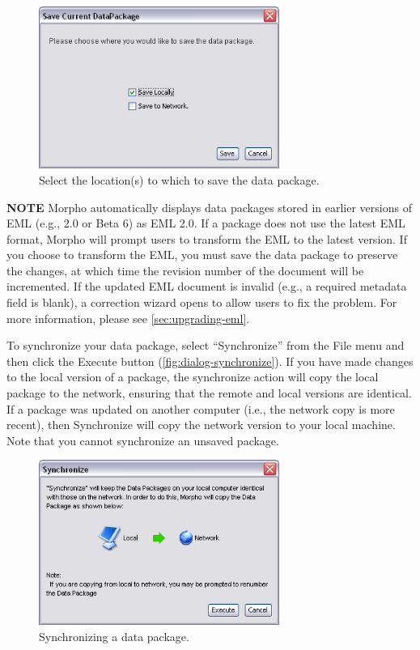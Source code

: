 \begin{figure}
  \centering
    \includegraphics[width=0.7\textwidth]{images/dialog-save-dp.png}
  \caption{Select the location(s) to which to save the data package.}
  \label{fig:dialog-save-dp}
\end{figure}

\begin{shaded}
  \textbf{NOTE} Morpho automatically displays data packages stored in
  earlier versions of EML (e.g., 2.0 or Beta 6) as EML 2.0. If a package
  does not use the latest EML format, Morpho will prompt users to
  transform the EML to the latest version. If you choose to transform
  the EML, you must save the data package to preserve the changes, at
  which time the revision number of the document will be incremented. If
  the updated EML document is invalid (e.g., a required metadata field
  is blank), a correction wizard opens to allow users to fix the
  problem. For more information, please see \autoref{sec:upgrading-eml}.
\end{shaded}

To synchronize your data package, select ``Synchronize'' from the File
menu and then click the Execute button
(\autoref{fig:dialog-synchronize}). If you have made changes to the
local version of a package, the synchronize action will copy the local
package to the network, ensuring that the remote and local versions are
identical. If a package was updated on another computer (i.e., the
network copy is more recent), then Synchronize will copy the network
version to your local machine. Note that you cannot synchronize an
unsaved package.

\begin{figure}
  \centering
    \includegraphics[width=0.7\textwidth]{images/dialog-synchronize.png}
  \caption{Synchronizing a data package.}
  \label{fig:dialog-synchronize}
\end{figure}

